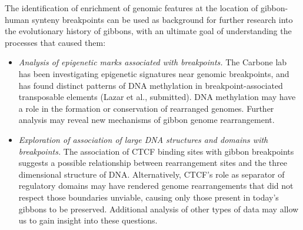 The identification of enrichment of genomic features at the location of gibbon-human synteny breakpoints can be used as background for further research into the evolutionary history of gibbons, with an ultimate goal of understanding the processes that caused them:

\begin{itemize}
\item \emph{Analysis of epigenetic marks associated with breakpoints.} The Carbone lab has been investigating epigenetic signatures near genomic breakpoints, and has found distinct patterns of DNA methylation in breakpoint-associated transposable elements (Lazar et al., submitted). DNA methylation may have a role in the formation or conservation of rearranged genomes. Further analysis may reveal new mechanisms of gibbon genome rearrangement.
\item \emph{Exploration of association of large DNA structures and domains with breakpoints.} The association of CTCF binding sites with gibbon breakpoints suggests a possible relationship between rearrangement sites and the three dimensional structure of DNA. Alternatively, CTCF's role as separator of regulatory domains may have rendered genome rearrangements that did not respect those boundaries unviable, causing only those present in today's gibbons to be preserved. Additional analysis of other types of data may allow us to gain insight into these questions.
\end{itemize}